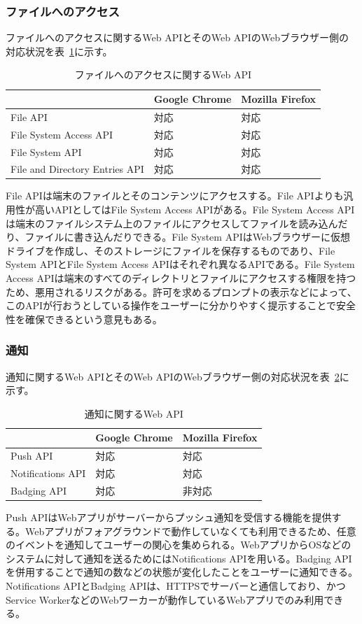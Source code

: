 \subsubsection{ファイルへのアクセス}\label{subsubsection:ファイルへのアクセス}
ファイルへのアクセスに関するWeb APIとそのWeb APIのWebブラウザー側の対応状況を表~\ref{table:ファイルへのアクセスに関するWeb API}に示す。
\begin{table}
  \caption{ファイルへのアクセスに関するWeb API}\label{table:ファイルへのアクセスに関するWeb API}
  \centering
  \begin{tabular}{|p{20em}|p{10em}|p{10em}|}
    \hline
    & Google Chrome & Mozilla Firefox \\ \hline
    File API & 対応 & 対応 \\ \hline
    File System Access API & 対応 & 対応 \\ \hline
    File System API & 対応 & 対応 \\ \hline
    File and Directory Entries API & 対応 & 対応 \\ \hline
  \end{tabular}
\end{table}
File APIは端末のファイルとそのコンテンツにアクセスする。File APIよりも汎用性が高いAPIとしてはFile System Access APIがある。File System Access APIは端末のファイルシステム上のファイルにアクセスしてファイルを読み込んだり、ファイルに書き込んだりできる。File System APIはWebブラウザーに仮想ドライブを作成し、そのストレージにファイルを保存するものであり、File System APIとFile System Access APIはそれぞれ異なるAPIである。File System Access APIは端末のすべてのディレクトリとファイルにアクセスする権限を持つため、悪用されるリスクがある。許可を求めるプロンプトの表示などによって、このAPIが行おうとしている操作をユーザーに分かりやすく提示することで安全性を確保できるという意見もある。
\subsubsection{通知}\label{subsubsection:通知}
通知に関するWeb APIとそのWeb APIのWebブラウザー側の対応状況を表~\ref{table:通知に関するWeb API}に示す。
\begin{table}
  \caption{通知に関するWeb API}\label{table:通知に関するWeb API}
  \centering
  \begin{tabular}{|p{20em}|p{10em}|p{10em}|}
    \hline
    & Google Chrome & Mozilla Firefox \\ \hline
    Push API & 対応 & 対応 \\ \hline
    Notifications API & 対応 & 対応 \\ \hline
    Badging API & 対応 & 非対応 \\ \hline
  \end{tabular}
\end{table}
Push APIはWebアプリがサーバーからプッシュ通知を受信する機能を提供する。Webアプリがフォアグラウンドで動作していなくても利用できるため、任意のイベントを通知してユーザーの関心を集められる。WebアプリからOSなどのシステムに対して通知を送るためにはNotifications APIを用いる。Badging APIを併用することで通知の数などの状態が変化したことをユーザーに通知できる。Notifications APIとBadging APIは、HTTPSでサーバーと通信しており、かつService WorkerなどのWebワーカーが動作しているWebアプリでのみ利用できる。
